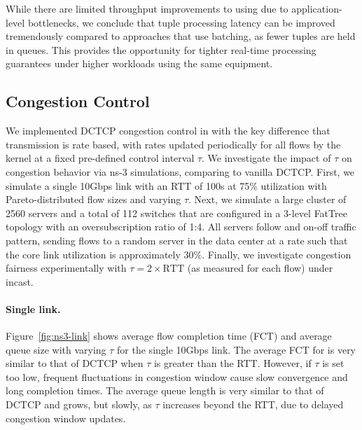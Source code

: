 \vspace{1ex}
\noindent While there are limited throughput improvements to using
\taas due to application-level bottlenecks, we conclude that tuple
processing latency can be improved tremendously compared to approaches
that use batching, as fewer tuples are held in queues. This provides
the opportunity for tighter real-time processing guarantees under
higher workloads using the same equipment.


\subsection{Congestion Control}

We implemented DCTCP congestion control in \rmttcp with the key
difference that transmission is rate based, with rates updated
periodically for all flows by the kernel at a fixed pre-defined
control interval $\tau$. We investigate the impact of $\tau$ on
congestion behavior via ns-3 simulations, comparing to vanilla
DCTCP. First, we simulate a single 10Gbps link with an RTT of
100\textmu s at 75\% utilization with Pareto-distributed flow sizes
and varying $\tau$. Next, we simulate a large cluster of 2560 servers
and a total of 112 switches that are configured in a 3-level FatTree
topology with an oversubscription ratio of 1:4.
All servers follow and on-off traffic pattern, sending flows to a
random server in the data center at a rate such that the core link
utilization is approximately 30\%. Finally, we investigate congestion
fairness experimentally with $\tau = 2\times\mathrm{RTT}$ (as measured for each
flow) under incast.

\paragraph{Single link.} Figure~\ref{fig:ns3-link} shows average flow
completion time (FCT) and average queue size with varying $\tau$ for
the single 10Gbps link. The average FCT for \rmttcp is very similar to
that of DCTCP when $\tau$ is greater than the RTT. However, if $\tau$
is set too low, frequent fluctuations in congestion window cause slow
convergence and long completion times. The average queue length is
very similar to that of DCTCP and grows, but slowly, as $\tau$
increases beyond the RTT, due to delayed congestion window updates.

